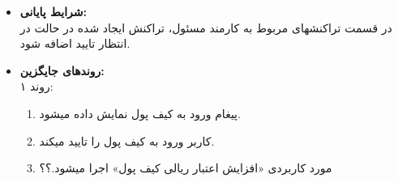 \documentclass{article}
\begin{document}
\begin{itemize}
\begin{enumerate}
\end{enumerate}

\item \textbf{شرایط پایانی:}\\ 
در قسمت تراکنشهای مربوط به کارمند مسئول، تراکنش ایجاد شده در حالت در انتظار تایید اضافه شود.
\item \textbf{روندهای جایگزین:}\\
روند ۱:\\
\begin{enumerate}
\item پیغام ورود به کیف پول نمایش داده میشود.
\item کاربر ورود به کیف پول را تایید میکند.
\item مورد کاربردی «افزایش اعتبار ریالی کیف پول» اجرا میشود.؟؟
\end{enumerate}

\end{itemize}


\noindent\makebox[\linewidth]{\rule{\paperwidth}{0.4pt}}
\end{document}
